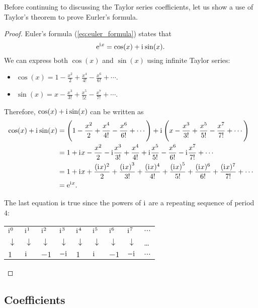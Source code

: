 Before continuing to discussing the Taylor series coefficients, let us show a use of Taylor's theorem to prove Eurler's formula.
\begin{proof}
  Euler's formula (\autoref{eq:euler_formula}) states that
  \[
    \mathrm{e}^{\mathrm{i}\mkern1mu x} = \cos(x) + \mathrm{i}\mkern1mu\sin(x).
  \]
  We can express both $\cos(x)$ and $\sin(x)$ using infinite Taylor series:
  \begin{itemize}
    \item $\cos(x) = 1-\frac{x^{2}}{2}+\frac{x^{4}}{4!}-\frac{x^{6}}{6!}+\cdots$.
    \item $\sin(x) = x-\frac{x^{3}}{3!}+\frac{x^{5}}{5!}-\frac{x^{7}}{7!}+\cdots$.
  \end{itemize}
  Therefore, $\cos(x)+\mathrm{i}\mkern1mu\sin(x)$ can be written as
  \begin{align*}
    \cos(x) + \mathrm{i}\mkern1mu\sin(x) &= \left(1-\frac{x^{2}}{2}+\frac{x^{4}}{4!}-\frac{x^{6}}{6!}+\cdots\right) + \mathrm{i}\mkern1mu\left(x-\frac{x^{3}}{3!}+\frac{x^{5}}{5!}-\frac{x^{7}}{7!}+\cdots\right)\\
                         &= 1+\mathrm{i}\mkern1mu x - \frac{x^{2}}{2} -\mathrm{i}\mkern1mu\frac{x^{3}}{3!} + \frac{x^{4}}{4!} + \mathrm{i}\mkern1mu\frac{x^{5}}{5!} - \frac{x^{6}}{6!} - \mathrm{i}\mkern1mu\frac{x^{7}}{7!} + \cdots\\
                         &= 1 +\mathrm{i}\mkern1mu x + \frac{(\mathrm{i}\mkern1mu x)^{2}}{2} + \frac{\left(\mathrm{i}\mkern1mu x\right)^{3}}{3!} + \frac{(\mathrm{i}\mkern1mu x)^{4}}{4!} + \frac{\left(\mathrm{i}\mkern1mu x\right)^{5}}{5!} + \frac{(\mathrm{i}\mkern1mu x)^{6}}{6!} + \frac{(\mathrm{i}\mkern1mu x)^{7}}{7!} + \cdots\\
                         &= \mathrm{e}^{\mathrm{i}\mkern1mu x}.
  \end{align*}

  The last equation is true since the powers of $\mathrm{i}\mkern1mu$ are a repeating sequence of period $4$:
  
  \centering
  \begin{tabular}{lllllllll}
    $\mathrm{i}\mkern1mu^{0}$ & $\mathrm{i}\mkern1mu^{1}$ & $\mathrm{i}\mkern1mu^{2}$ & $\mathrm{i}\mkern1mu^{3}$ & $\mathrm{i}\mkern1mu^{4}$ & $\mathrm{i}\mkern1mu^{5}$ & $\mathrm{i}\mkern1mu^{6}$ & $\mathrm{i}\mkern1mu^{7}$ & $\dots$\\
    $\downarrow$ & $\downarrow$ & $\downarrow$ & $\downarrow$ & $\downarrow$ & $\downarrow$ & $\downarrow$ & $\downarrow$ & \dots\\
    $1$ & $\mathrm{i}\mkern1mu$ & $-1$ & $-\mathrm{i}\mkern1mu$ & $1$ & $\mathrm{i}\mkern1mu$ & $-1$ & $-\mathrm{i}\mkern1mu$ & $\dots$\\
  \end{tabular}

\end{proof}

\subsection{Coefficients}
